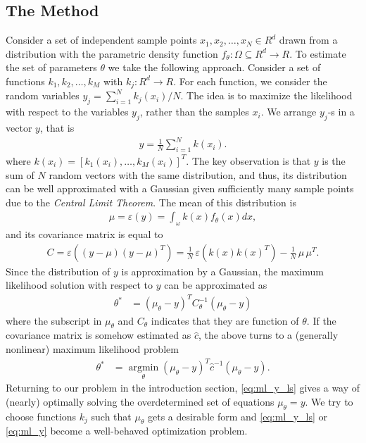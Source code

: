 \subsection{The Method}
Consider a set of independent sample points $x_1, x_2,\ldots,x_N \in R ^d$ drawn from a distribution with the parametric
density function $f_\theta\colon \Omega \subseteq R^d \rightarrow R$. 
To estimate the set of parameters $\theta$ we take the following approach. 
Consider a set of
functions $k_1,k_2,\ldots, k_M$ with $k_j\colon R^d \rightarrow R$. For each function, we consider the random variables
$y_j = \sum_{i=1}^N k_j(x_i) / N$. The idea is to maximize the likelihood with respect to the variables $y_j$, rather
than the samples $x_i$. We arrange $y_j$-s in a vector $y$, that is
\begin{align}
 \label{eq:y}
  y =  \frac{1}{N} \sum_{i=1}^N k(x_i). 
\end{align}
where $k(x_i) = [k_1(x_i), \ldots, k_M(x_i)]^T$. The key observation is that $y$ is the sum of $N$ random vectors with the
same distribution, and thus, its distribution can be well approximated with a Gaussian given sufficiently many
sample points due to the \emph{Central Limit Theorem}. The mean of this distribution is
\begin{align}
  \label{eq:e}
 \mu = \varepsilon(y) = \int_\omega k(x) f_\theta(x) dx, 
\end{align}
and its covariance matrix is equal to  
\begin{align}
  \label{eq:cov}
  C = \varepsilon((y-\mu)(y-\mu)^T) = \frac{1}{N} \, \varepsilon\left(k(x)k(x)^T\right) - \frac{1}{N}\, \mu\,\mu^T.
\end{align}
Since the distribution of $y$ is approximation by a Gaussian, the maximum
likelihood solution with respect to $y$ can be approximated as
\begin{align}
  \label{eq:ml_y}
  \theta^* &= (\mu_\theta - y)^T C_\theta^{-1} (\mu_\theta - y)
\end{align}
where the subscript in $\mu_\theta$ and $C_\theta$ indicates that they are function of $\theta$. If the covariance matrix is
somehow estimated as $\hat{c}$, the above turns to a (generally nonlinear) maximum likelihood problem
\begin{align}
  \label{eq:ml_y_ls}
  \theta^* &= \underset{\theta}{\operatorname{argmin}}(\mu_\theta - y)^T \hat{c}^{-1} (\mu_\theta - y). 
\end{align}
Returning to our problem in the introduction section, \ref{eq:ml_y_ls} gives a way of (nearly) optimally solving the
overdetermined set of equations $\mu_\theta = y$. We try to choose functions $k_j$ such that $\mu_\theta$ gets a
desirable form and \ref{eq:ml_y_ls} or \ref{eq:ml_y} become a well-behaved optimization problem. 
